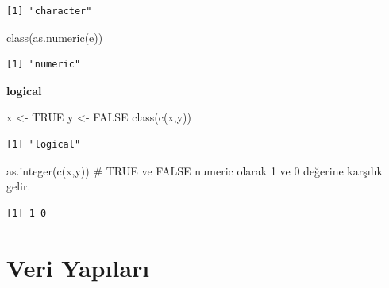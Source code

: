 \documentclass[
  letterpaper,
  DIV=11,
  numbers=noendperiod]{scrreprt}
\newenvironment{Shaded}{\begin{snugshade}}{\end{snugshade}}
\newcommand{\CommentTok}[1]{\textcolor[rgb]{0.37,0.37,0.37}{#1}}
\newcommand{\ConstantTok}[1]{\textcolor[rgb]{0.56,0.35,0.01}{#1}}
\newcommand{\FunctionTok}[1]{\textcolor[rgb]{0.28,0.35,0.67}{#1}}
\newcommand{\NormalTok}[1]{\textcolor[rgb]{0.00,0.23,0.31}{#1}}
\newcommand{\OtherTok}[1]{\textcolor[rgb]{0.00,0.23,0.31}{#1}}
\begin{document}
\begin{verbatim}
[1] "character"
\end{verbatim}

\begin{Shaded}
\begin{Highlighting}[]
\FunctionTok{class}\NormalTok{(}\FunctionTok{as.numeric}\NormalTok{(e))}
\end{Highlighting}
\end{Shaded}

\begin{verbatim}
[1] "numeric"
\end{verbatim}

\textbf{logical}

\begin{Shaded}
\begin{Highlighting}[]
\NormalTok{x }\OtherTok{\textless{}{-}} \ConstantTok{TRUE}
\NormalTok{y }\OtherTok{\textless{}{-}} \ConstantTok{FALSE}
\FunctionTok{class}\NormalTok{(}\FunctionTok{c}\NormalTok{(x,y))}
\end{Highlighting}
\end{Shaded}

\begin{verbatim}
[1] "logical"
\end{verbatim}

\begin{Shaded}
\begin{Highlighting}[]
\FunctionTok{as.integer}\NormalTok{(}\FunctionTok{c}\NormalTok{(x,y)) }\CommentTok{\# TRUE ve FALSE numeric olarak 1 ve 0 değerine karşılık gelir.}
\end{Highlighting}
\end{Shaded}

\begin{verbatim}
[1] 1 0
\end{verbatim}

\hypertarget{veri-yapux131larux131}{%
\section{Veri Yapıları}\label{veri-yapux131larux131}}
\end{document}
